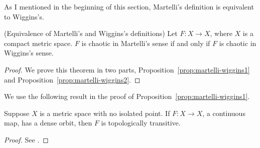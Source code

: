 \documentclass[10pt,draft,twoside]{book}
\begin{document}
As I mentioned in the beginning of this section, Martelli's definition is equivalent to Wiggins's.
\begin{theorem}
  (Equivalence of Martelli's and Wiggins's definitions)
  Let $F: X \to X$, where $X$ is a compact metric space.
  $F$ is chaotic in Martelli's sense if and only if $F$ is chaotic in Wiggins's sense.
  \label{thm:martelli-wiggins}
  \begin{proof}
    We prove this theorem in two parts, Proposition~\ref{prop:martelli-wiggins1} and Proposition~\ref{prop:martelli-wiggins2}.
  \end{proof}
\end{theorem}
We use the following result in the proof of Proposition~\ref{prop:martelli-wiggins1}.
\begin{proposition}
  \citep{silverman}
  Suppose $X$ is a metric space with no isolated point.
  If $F: X\to X$, a continuous map, has a dense orbit, then $F$ is topologically transitive.
  \begin{proof}
    See \citep{silverman}.
  \end{proof}
  \label{lem:dob-transitivity}
\end{proposition}
\end{document}
